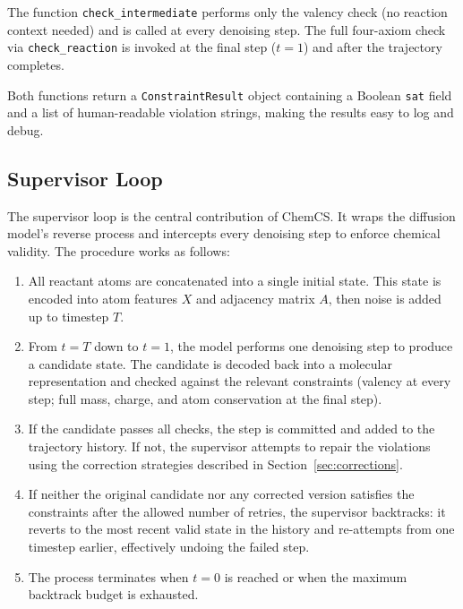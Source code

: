 \documentclass[11pt]{article}
\begin{document}
The function \texttt{check\_intermediate} performs only the valency
check (no reaction context needed) and is called at every denoising
step. The full four-axiom check via \texttt{check\_reaction} is invoked
at the final step ($t = 1$) and after the trajectory completes.

Both functions return a \texttt{ConstraintResult} object containing a
Boolean \texttt{sat} field and a list of human-readable violation
strings, making the results easy to log and debug.

\subsection{Supervisor Loop}

The supervisor loop is the central contribution of ChemCS. It wraps the
diffusion model's reverse process and intercepts every denoising step to
enforce chemical validity. The procedure works as follows:

\begin{enumerate}[nosep]
  \item All reactant atoms are concatenated into a single initial state.
        This state is encoded into atom features $X$ and adjacency
        matrix $A$, then noise is added up to timestep $T$.
  \item From $t = T$ down to $t = 1$, the model performs one denoising
        step to produce a candidate state. The candidate is decoded back
        into a molecular representation and checked against the relevant
        constraints (valency at every step; full mass, charge, and atom
        conservation at the final step).
  \item If the candidate passes all checks, the step is committed and
        added to the trajectory history. If not, the supervisor attempts
        to repair the violations using the correction strategies described
        in Section~\ref{sec:corrections}.
  \item If neither the original candidate nor any corrected version
        satisfies the constraints after the allowed number of retries,
        the supervisor backtracks: it reverts to the most recent valid
        state in the history and re-attempts from one timestep earlier,
        effectively undoing the failed step.
  \item The process terminates when $t = 0$ is reached or when the
        maximum backtrack budget is exhausted.
\end{enumerate}
\end{document}
